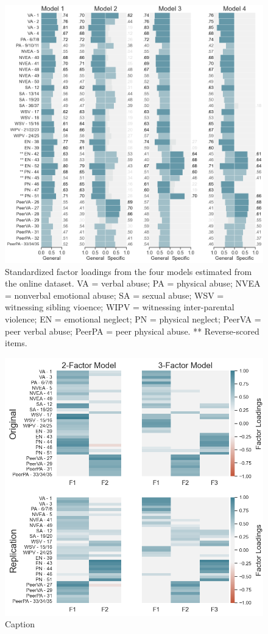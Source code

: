 \documentclass[letterpaper,man,natbib]{apa6}  %
\begin{document}
\begin{figure}
    \centering
    \includegraphics[width=1.1\textwidth,center]{figures/fig02.png}
    \caption{Standardized factor loadings from the four models estimated from the online dataset. VA = verbal abuse; PA = physical abuse; NVEA = nonverbal emotional abuse; SA = sexual abuse; WSV = witnessing sibling vioence; WIPV = witnessing inter-parental violence; EN = emotional neglect; PN = physical neglect; PeerVA = peer verbal abuse; PeerPA = peer physical abuse. ** Reverse-scored items.}
    \label{fig:loadings_online}
\end{figure}

\begin{figure}
    \centering
    \includegraphics[width=1\textwidth,center]{figures/fig03.png}
    \caption{Caption}
    \label{fig:efa}
\end{figure}
\end{document}
